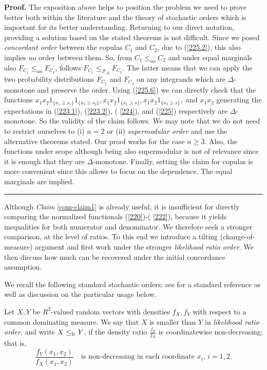 \documentclass[onecolumn]{article}
\newtheorem{definition}[theorem]{Definition}
\let\olddefinition\definition
\let\endolddefinition\enddefinition
\renewenvironment{definition}{\olddefinition\normalfont}{\endolddefinition}
\newenvironment{proof}[1][Proof]{\noindent\textbf{#1.} }{\ \rule{0.5em}{0.5em}}
\begin{document}
\begin{proof}
The exposition above helps to position the problem we need to prove better
both within the literature and the theory of stochastic orders which is
important for its better understanding. Returning to our direct notation,
providing a solution based on the stated theorems is not difficult. Since we
posed \textit{concordant order} between the copulas $C_{1}$ and $C_{2}$, due
to (\ref{225.2}), this also implies $uo$ order between them. So, from $%
C_{1}\leq _{uo}C_{2}$ and under equal marginals also $F_{C_{1}}\leq
_{uo}F_{C_{2}}$, follows $F_{C_{1}}\leq _{\mathcal{F}_{\Delta }}F_{C_{2}}$.
The latter means that we can apply the two probability distributions $%
F_{C_{1}}$ and $F_{C_{2}}$ on any integrands which are $\Delta $-monotone
and preserve the order. Using (\ref{225.6}) we can directly check that the
functions $x_{1}x_{2}1_{\{x_{1}\geq s_{1}\}}1_{\{x_{2}\geq
s_{2}\}},x_{1}x_{2}1_{\{x_{1}\geq s\}},x_{1}x_{2}1_{\{x_{2}\geq s\}},$ and $%
x_{1}x_{2}$ generating the expectations in (\ref{223.1}), (\ref{223.2}), (%
\ref{224}), and (\ref{225}) respectively are $\Delta $-monotone. So the
validity of the claim follows. We may note that we do not need to restrict
ourselves to (i) $n=2$ or (ii) \textit{supermodular order} and use the
alternative theorems stated. Our proof works for the case $n\geq 3.$ Also,
the functions under scope although being also supermodular is not of
relevance since it is enough that they are $\Delta $-monotone. Finally,
setting the claim for copulas is more convenient since this allows to focus
on the dependence. The equal marginals are implied.
\end{proof}

Although \textit{Claim} \ref{com-claim1} is already useful, it is
insufficient for directly comparing the normalized functionals (\ref{220})-(%
\ref{222}), because it yields inequalities for both numerator and
denominator. We therefore seek a stronger comparison, at the level of
ratios. To this end we introduce a tilting (change-of-measure) argument and
first work under the stronger \textit{likelihood ratio order}. We then
discuss how much can be recovered under the initial concordance assumption.

We recall the following standard stochastic orders; see \cite{[24]} for a
standard reference as well as discussion on the particular usage below.

\begin{definition}
\label{lr} Let $X,Y$ be $R^{2}$-valued random vectors with densities $%
f_{X},f_{Y}$ with respect to a common dominating measure. We say that $X$ is
smaller than $Y$ in \textit{likelihood ratio order}, and write $X\leq _{%
\mathrm{lr}}Y$, if the density ratio $\frac{f_{Y}}{f_{X}}$ is coordinatewise
non-decreasing; that is, 
\begin{equation}
\frac{f_{Y}(x_{1},x_{2})}{f_{X}(x_{1},x_{2})}\quad \text{is non-decreasing
in each coordinate $x_{i}$, $i=1,2.$}  \label{800}
\end{equation}
\end{definition}
\end{document}
